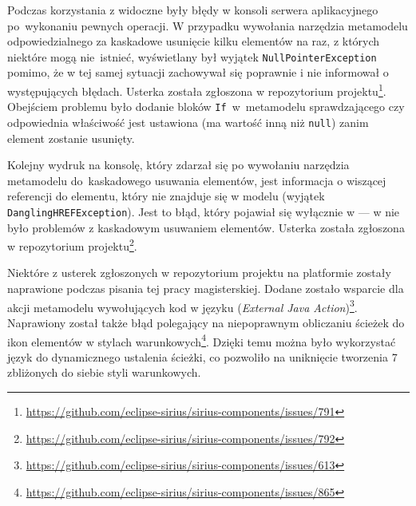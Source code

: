 Podczas korzystania z \SiriusWeb{} widoczne były błędy w konsoli serwera
aplikacyjnego po~wykonaniu pewnych operacji. W przypadku wywołania narzędzia
metamodelu odpowiedzialnego za kaskadowe usunięcie kilku elementów na raz, z
których niektóre mogą nie~istnieć, wyświetlany był wyjątek
\texttt{NullPointerException} pomimo, że w tej samej sytuacji \SiriusDesktop{}
zachowywał się poprawnie i nie informował o występujących
błędach.
Usterka została zgłoszona w repozytorium projektu\footnote{
	\url{https://github.com/eclipse-sirius/sirius-components/issues/791}
}. Obejściem problemu było dodanie bloków \texttt{If}~w~metamodelu
sprawdzającego czy odpowiednia właściwość jest ustawiona (ma wartość inną niż
\texttt{null}) zanim element zostanie usunięty.

Kolejny wydruk na konsolę, który zdarzał się po wywołaniu narzędzia metamodelu
do~kaskadowego usuwania elementów, jest informacja o wiszącej referencji do
elementu, który nie znajduje się w modelu (wyjątek
\texttt{DanglingHREFException}). Jest to błąd, który pojawiał się wyłącznie w
\SiriusWeb{} --- w \SiriusDesktop{} nie było problemów z kaskadowym
usuwaniem elementów. Usterka została zgłoszona w repozytorium
projektu\footnote{
	\url{https://github.com/eclipse-sirius/sirius-components/issues/792}
}.

Niektóre z usterek zgłoszonych w repozytorium projektu na platformie
\GitHub{} zostały naprawione podczas pisania tej pracy magisterskiej.
Dodane zostało wsparcie dla akcji metamodelu wywołujących kod w języku \Java{}
(\emph{External Java Action})\footnote{
	\url{https://github.com/eclipse-sirius/sirius-components/issues/613}}.
Naprawiony został także błąd polegający na niepoprawnym obliczaniu ścieżek do
ikon elementów w stylach warunkowych\footnote{
	\url{https://github.com/eclipse-sirius/sirius-components/issues/865}
}. Dzięki temu można było wykorzystać język \AQL{} do dynamicznego
ustalenia ścieżki, co pozwoliło na uniknięcie tworzenia 7 zbliżonych do
siebie styli warunkowych.

